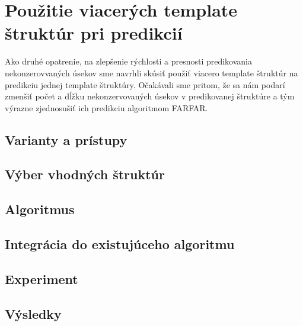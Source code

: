 \chapter{Použitie viacerých template štruktúr pri predikcií}

Ako druhé opatrenie, na zlepšenie rýchlosti a presnosti predikovania nekonzerovvaných úsekov sme navrhli skúsiť použiť viacero template štruktúr na predikciu jednej template štruktúry. Očakávali sme pritom, že sa nám podarí zmenšiť počet a dĺžku nekonzervovaných úsekov v predikovanej štruktúre a tým výrazne zjednosušiť ich predikciu algoritmom FARFAR.

\section{Varianty a prístupy}


\section{Výber vhodných štruktúr}


\section{Algoritmus}


\section{Integrácia do existujúceho algoritmu}


\section{Experiment}


\section{Výsledky}